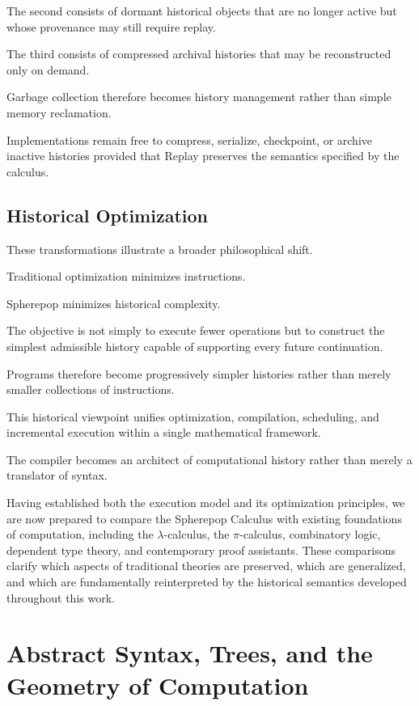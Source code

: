 \documentclass[12pt,oneside]{article}
\theoremstyle{definition}
\theoremstyle{remark}
\begin{document}
The second consists of dormant historical objects that are no longer active
but whose provenance may still require replay.

The third consists of compressed archival histories that may be reconstructed
only on demand.

Garbage collection therefore becomes history management rather than simple
memory reclamation.

Implementations remain free to compress, serialize, checkpoint, or archive
inactive histories provided that Replay preserves the semantics specified by
the calculus.

\subsection{Historical Optimization}

These transformations illustrate a broader philosophical shift.

Traditional optimization minimizes instructions.

Spherepop minimizes historical complexity.

The objective is not simply to execute fewer operations but to construct the
simplest admissible history capable of supporting every future continuation.

Programs therefore become progressively simpler histories rather than merely
smaller collections of instructions.

This historical viewpoint unifies optimization, compilation, scheduling, and
incremental execution within a single mathematical framework.

The compiler becomes an architect of computational history rather than merely
a translator of syntax.

Having established both the execution model and its optimization principles,
we are now prepared to compare the Spherepop Calculus with existing
foundations of computation, including the $\lambda$-calculus, the
$\pi$-calculus, combinatory logic, dependent type theory, and contemporary
proof assistants. These comparisons clarify which aspects of traditional
theories are preserved, which are generalized, and which are fundamentally
reinterpreted by the historical semantics developed throughout this work.

\section{Abstract Syntax, Trees, and the Geometry of Computation}
\end{document}
